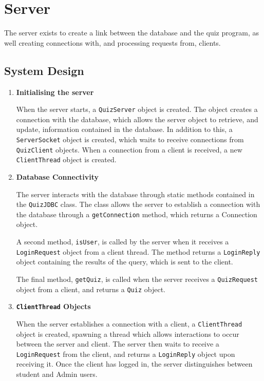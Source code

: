 \section{Server}
\label{sec:server}

The server exists to create a link between the database and the quiz program,
as well creating connections with, and processing requests from, clients.

\subsection{System Design}
\label{sub:system_design}

\begin{enumerate}
	\item \textbf{Initialising the server}

	When the server starts, a \texttt{QuizServer} object is created. The object
	creates a connection with the database, which allows the server object to
	retrieve, and update, information contained in the database.  In addition
	to this, a \texttt{ServerSocket} object is created, which waits to receive
	connections from \texttt{QuizClient} objects. When a connection from a
	client is received, a new \texttt{ClientThread} object is created.

	\item \textbf{Database Connectivity}

	The server interacts with the database through static methods contained in
	the \texttt{QuizJDBC} class.  The class allows the server to establish a
	connection with the database through a \texttt{getConnection} method, which
	returns a Connection object.

	A second method, \texttt{isUser}, is called by the server when it receives
	a \texttt{LoginRequest} object from a client thread. The method returns a
	\texttt{LoginReply} object containing the results of the query, which is
	sent to the client.

	The final method, \texttt{getQuiz}, is called when the server receives a
	\texttt{QuizRequest} object from a client, and returns a \texttt{Quiz}
	object.

	\item \textbf{\texttt{ClientThread} Objects}

	When the server establishes a connection with a client, a
	\texttt{ClientThread} object is created, spawning a thread which allows
	interactions to occur between the server and  client. The server then waits
	to receive a \texttt{LoginRequest} from the client, and returns a
	\texttt{LoginReply} object upon receiving it.  Once the client has logged in,
	the server distinguishes between student and Admin users.


\end{enumerate}
